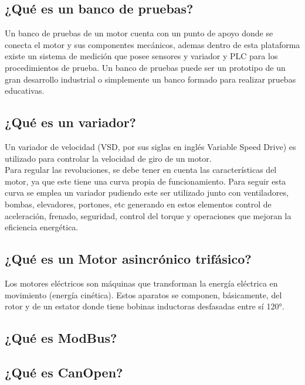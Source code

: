 \subsection{¿Qué es un banco de pruebas?}

Un banco de pruebas de un motor cuenta con un punto de apoyo donde se conecta el motor y sus componentes mecánicos, ademas dentro de esta plataforma existe un sistema de medición que posee sensores y variador y PLC para los procedimientos de prueba.
Un banco de pruebas puede ser un prototipo de un gran desarrollo industrial o simplemente un banco formado para realizar pruebas educativas. 


\subsection{¿Qué es un variador?}
Un variador de velocidad (VSD, por sus siglas en inglés Variable Speed Drive) es utilizado para controlar la velocidad de giro de un motor. \\
Para regular las revoluciones, se debe tener en cuenta las características del motor, ya que este tiene una curva propia de funcionamiento. Para seguir esta curva se emplea un variador pudiendo este ser utilizado junto con ventiladores, bombas, elevadores, portones, etc generando en estos elementos control de aceleración, frenado, seguridad, control del torque y operaciones que mejoran la eficiencia energética.

\subsection{¿Qué es un Motor asincrónico trifásico?}
Los motores eléctricos son máquinas que transforman la energía eléctrica en
movimiento (energía cinética). Estos aparatos se componen, básicamente, del rotor y de un estator donde tiene bobinas inductoras desfasadas entre sí 120°.

\subsection{¿Qué es ModBus?}
\subsection{¿Qué es CanOpen?}
